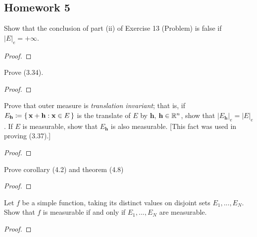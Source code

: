 \subsection{Homework 5}
\begin{problem}
Show that the conclusion of part  (ii) of Exercise 13 (Problem) is false if
$|E|_e=+\infty$.
\end{problem}
\begin{proof}
\end{proof}

\begin{problem}
Prove (3.34).
\end{problem}
\begin{proof}
\end{proof}

\begin{problem}
Prove that outer measure is \emph{translation invariant}; that is, if
$E_{\textbf{h}}\coloneqq\left\{\,\mathbf{x}+\mathbf{h}:\mathbf{x}\in
  E\,\right\}$ is the translate of $E$ by $\mathbf{h}$,
$\mathbf{h}\in\mathbb{R}^n$, show that
$|E_{\mathbf{h}}|_e=|E|_e$. If $E$ is measurable,
show that $E_{\mathbf{h}}$ is also measurable. [This fact was used in
proving (3.37).]
\end{problem}
\begin{proof}
\end{proof}

\begin{problem}
Prove corollary (4.2) and theorem (4.8)
\end{problem}
\begin{proof}
\end{proof}

\begin{problem}
Let $f$ be a simple function, taking its distinct values on disjoint sets
$E_1,...,E_N$. Show that $f$ is measurable if and only if $E_1,...,E_N$ are
measurable.
\end{problem}
\begin{proof}
\end{proof}

